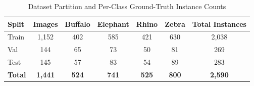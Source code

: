 \begin{table}[htbp]
\centering
\caption{Dataset Partition and Per-Class Ground-Truth Instance Counts}
\label{tab:dataset_splits}
\begin{tabular}{lcccccc}
\toprule
\textbf{Split} & \textbf{Images} & \textbf{Buffalo} & \textbf{Elephant} & \textbf{Rhino} & \textbf{Zebra} & \textbf{Total Instances} \\
\midrule
Train & 1,152 & 402 & 585 & 421 & 630 & 2,038 \\
Val & 144 & 65 & 73 & 50 & 81 & 269 \\
Test & 145 & 57 & 83 & 54 & 89 & 283 \\
\midrule
\textbf{Total} & \textbf{1,441} & \textbf{524} & \textbf{741} & \textbf{525} & \textbf{800} & \textbf{2,590} \\
\bottomrule
\end{tabular}
\end{table}

